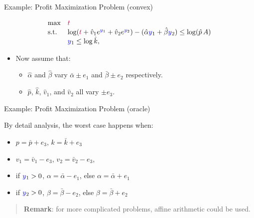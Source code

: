 \documentclass[10pt,ignorenonframetext,serif,onlymath]{beamer}
\providecommand{\tightlist}{%
  \setlength{\itemsep}{0pt}\setlength{\parskip}{0pt}}
\begin{document}
\begin{frame}{Example: Profit Maximization Problem (convex)}
\protect\hypertarget{example-profit-maximization-problem-convex}{}

\[\begin{array}{ll}
\text{max}  & {\color{purple}t} \\
\text{s.t.} & \log({\color{purple}t} + \hat{v}_1 e^{{\color{blue}y}_1} + \hat{v}_2 e^{{\color{blue}y}_2}) - (\hat{\alpha} {\color{blue}y}_1 + \hat{\beta} {\color{blue}y}_2) \le \log(\hat{p}\,A)  \\
                  & {\color{blue}y}_1 \le \log \hat{k} ,
\end{array}\]

\begin{itemize}
\tightlist
\item
  Now assume that:

  \begin{itemize}
  \tightlist
  \item
    \(\hat{\alpha}\) and \(\hat{\beta}\) vary \(\bar{\alpha} \pm e_1\)
    and \(\bar{\beta} \pm e_2\) respectively.
  \item
    \(\hat{p}\), \(\hat{k}\), \(\hat{v}_1\), and \(\hat{v}_2\) all vary
    \(\pm e_3\).
  \end{itemize}
\end{itemize}

\end{frame}

\begin{frame}{Example: Profit Maximization Problem (oracle)}
\protect\hypertarget{example-profit-maximization-problem-oracle}{}

By detail analysis, the worst case happens when:

\begin{itemize}
\tightlist
\item
  \(p = \bar{p} + e_3\), \(k = \bar{k} + e_3\)
\item
  \(v_1 = \bar{v}_1 - e_3\), \(v_2 = \bar{v}_2 - e_3\),
\item
  if \({\color{blue}y}_1 > 0\), \(\alpha = \bar{\alpha} - e_1\), else
  \(\alpha = \bar{\alpha} + e_1\)
\item
  if \({\color{blue}y}_2 > 0\), \(\beta = \bar{\beta} - e_2\), else
  \(\beta = \bar{\beta} + e_2\)
\end{itemize}

\begin{quote}
\textbf{Remark}: for more complicated problems, affine arithmetic could
be used.
\end{quote}

\end{frame}
\end{document}
